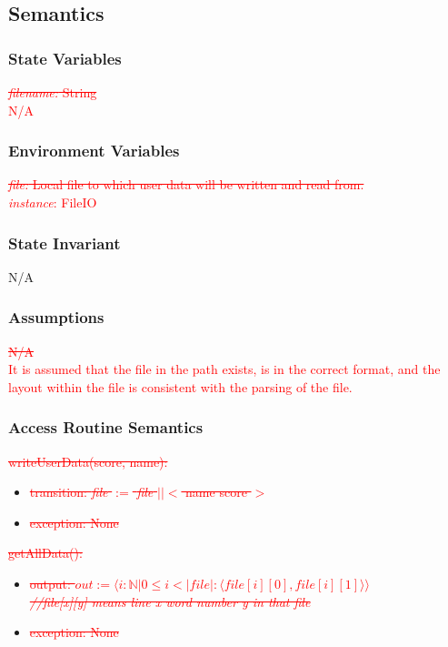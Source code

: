 \documentclass[12pt]{article}
\begin{document}
\subsection {Semantics}

\subsubsection {State Variables}
\textcolor{red}{\sout{\textit{filename:} String}}\\
\textcolor{red}{N/A}

\subsubsection {Environment Variables}
\textcolor{red}{\sout{\textit{file:} Local file to which user data will be written and read from.}}\\
\textcolor{red}{\textit{instance}: FileIO}

\subsubsection {State Invariant}
N/A
\subsubsection {Assumptions}
\textcolor{red}{\sout{N/A}}\\
\textcolor{red}{It is assumed that the file in the path exists, is in the correct format, and the layout within the file is consistent with the parsing of the file.}

\subsubsection {Access Routine Semantics}

\noindent \textcolor{red}{\sout{writeUserData(score, name):}}
\begin{itemize}
	\item \textcolor{red}{\sout{transition: \textit{file} $:=$ \textit{file} $||<$ name score $>$}}
	\item \textcolor{red}{\sout{exception: None}}
\end{itemize}

\noindent \textcolor{red}{\sout{getAllData():}}
\begin{itemize}
	\item \textcolor{red}{\sout{output: $out:= \langle i: \mathbb{N} | 0 \leq i < |file|: \langle file[i][0], file[i][1] \rangle\rangle$\\\textit{//file[x][y] means line x word number y in that file}}}
	\item \textcolor{red}{\sout{exception: None}}
\end{itemize}
\end{document}
